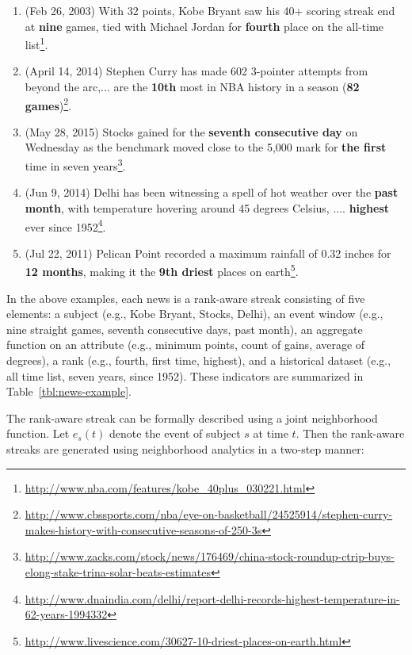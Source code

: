 \begin{enumerate}
\setlength\itemsep{-0.05cm}
\item(Feb 26, 2003) With 32 points, Kobe Bryant saw his 40+ scoring streak end at \textbf{nine} games,  tied with Michael Jordan for \textbf{fourth} place on the all-time list\footnote{\url{http://www.nba.com/features/kobe_40plus_030221.html}}. 

\item(April 14, 2014) Stephen Curry has made 602 3-pointer attempts from beyond the arc,... are the \textbf{10th} most in NBA history in a season (\textbf{82 games})\footnote{\url{http://www.cbssports.com/nba/eye-on-basketball/24525914/stephen-curry-makes-history-with-consecutive-seasons-of-250-3s}}.

\item (May 28, 2015) Stocks gained for the \textbf{seventh consecutive day} on Wednesday as the benchmark moved close to the 5,000 mark for \textbf{the first} time in seven years\footnote{\url{http://www.zacks.com/stock/news/176469/china-stock-roundup-ctrip-buys-elong-stake-trina-solar-beats-estimates}}.

\item (Jun 9,  2014) Delhi has been witnessing a spell of hot weather  over the \textbf{past month}, with temperature hovering around 45 degrees Celsius, .... \textbf{highest} ever since 1952\footnote{\url{http://www.dnaindia.com/delhi/report-delhi-records-highest-temperature-in-62-years-1994332}}.

\item(Jul 22, 2011) Pelican Point recorded a maximum rainfall of 0.32 inches for \textbf{12 months}, making it the  \textbf{9th driest} places on earth\footnote{\url{http://www.livescience.com/30627-10-driest-places-on-earth.html}}.
\end{enumerate}
 
In the above examples, each news is a rank-aware streak consisting of five elements: a subject (e.g., Kobe Bryant, Stocks, Delhi), an event window (e.g., nine straight games, seventh consecutive days, past month), an aggregate function on an attribute
(e.g., minimum points, count of gains, average of degrees), a rank (e.g., fourth, first time, highest), and a
historical dataset (e.g., all time list, seven years, since 1952). These indicators are summarized in
Table~\ref{tbl:news-example}.

The rank-aware streak can be formally described using a joint neighborhood function. 
Let $e_s(t)$ denote the event of subject $s$ at time $t$. Then the rank-aware streaks are generated using neighborhood analytics in a two-step manner: 

